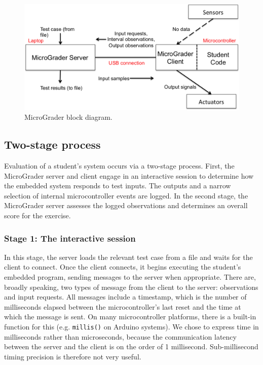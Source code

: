 \documentclass[12pt]{article}
\begin{document}
\begin{figure}[h]
\centering
\includegraphics[width=\linewidth]{test-mode.png}
\caption{MicroGrader block diagram.}
\label{fig:test-mode}
\end{figure}

\subsection{Two-stage process}
Evaluation of a student's system occurs via a two-stage process.  First, the MicroGrader server and client engage in an interactive session to determine how the embedded system responds to test inputs.  The outputs and a narrow selection of internal microcontroller events are logged.  In the second stage, the MicroGrader server assesses the logged observations and determines an overall score for the exercise.

\subsubsection{Stage 1: The interactive session}
In this stage, the server loads the relevant test case from a file and waits for the client to connect.  Once the client connects, it begins executing the student's embedded program, sending messages to the server when appropriate.  There are, broadly speaking, two types of message from the client to the server: observations and input requests.  All messages include a timestamp, which is the number of milliseconds elapsed between the microcontroller's last reset and the time at which the message is sent.  On many microcontroller platforms, there is a built-in function for this (e.g. \texttt{millis()} on Arduino systems).  We chose to express time in milliseconds rather than microseconds, because the communication latency between the server and the client is on the order of 1 millisecond.  Sub-millisecond timing precision is therefore not very useful.
\end{document}
